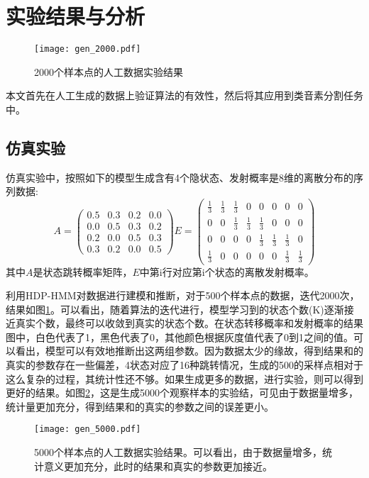\section{实验结果与分析}
\begin{figure}
\centering 
\texttt{[image: gen\_2000.pdf]} 
\vspace{-4pt}
  \caption{2000个样本点的人工数据实验结果} \label{fig:gendata_2000}
  \vspace{-8pt}
\end{figure}
本文首先在人工生成的数据上验证算法的有效性，然后将其应用到类音素分割任务中。
\subsection{仿真实验}

仿真实验中，按照如下的模型生成含有4个隐状态、发射概率是8维的离散分布的序列数据:
\begin{equation}
A={\begin{pmatrix}
0.5&0.3&0.2&0.0\\
0.0&0.5&0.3&0.2\\
0.2&0.0&0.5&0.3\\
0.3&0.2&0.0&0.5
\end{pmatrix}}
E={\begin{pmatrix}
\frac{1}{3}&\frac{1}{3}&\frac{1}{3}&0&0&0&0&0\\
0&0&\frac{1}{3}&\frac{1}{3}&\frac{1}{3}&0&0&0\\
0&0&0&0&\frac{1}{3}&\frac{1}{3}&\frac{1}{3}&0\\
\frac{1}{3}&0&0&0&0&0&\frac{1}{3}&\frac{1}{3}
\end{pmatrix}}
\end{equation}
其中$A$是状态跳转概率矩阵，$E$中第i行对应第i个状态的离散发射概率。

利用HDP-HMM对数据进行建模和推断，对于500个样本点的数据，迭代2000次，结果如图\ref{fig:gendata_2000}。可以看出，随着算法的迭代进行，模型学习到的状态个数(K)逐渐接近真实个数，最终可以收敛到真实的状态个数。在状态转移概率和发射概率的结果图中，白色代表了1，黑色代表了0，其他颜色根据灰度值代表了0到1之间的值。可以看出，模型可以有效地推断出这两组参数。因为数据太少的缘故，得到结果和的真实的参数存在一些偏差，4状态对应了16种跳转情况，生成的500的采样点相对于这么复杂的过程，其统计性还不够。如果生成更多的数据，进行实验，则可以得到更好的结果。如图\ref{fig:gendata_5000}，这是生成5000个观察样本的实验结，可见由于数据量增多，统计量更加充分，得到结果和的真实的参数之间的误差更小。
\begin{figure}
\centering 
\texttt{[image: gen\_5000.pdf]} 
\vspace{-4pt}
  \caption{5000个样本点的人工数据实验结果。可以看出，由于数据量增多，统计意义更加充分，此时的结果和真实的参数更加接近。} \label{fig:gendata_5000}
  \vspace{-8pt}
\end{figure}

